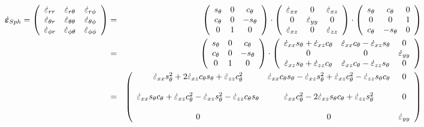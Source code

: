 \documentclass[a4paper,12pt]{article}
\begin{document}
\begin{eqnarray}
\dot{\bm \varepsilon}_{\tiny Sph}=
\left(
\begin{array}{ccc}
\dot\varepsilon_{rr}       & \dot\varepsilon_{r\theta}      & \dot\varepsilon_{r\phi} \\
\dot\varepsilon_{\theta r} & \dot\varepsilon_{\theta\theta} & \dot\varepsilon_{\theta\phi} \\
\dot\varepsilon_{\phi r}   & \dot\varepsilon_{\phi \theta}  & \dot\varepsilon_{\phi\phi}
\end{array}
\right)
&=&
\left(
\begin{array}{ccc}
s_\theta  & 0 & c_\theta \\
c_\theta  & 0 & -s_\theta \\
0 & 1 & 0 
\end{array}
\right)
\cdot
\left(
\begin{array}{ccc}
\dot\varepsilon_{xx} & 0 & \dot{\varepsilon}_{xz} \\
0 & \dot{\varepsilon}_{yy}  & 0 \\
\dot{\varepsilon}_{xz} & 0 & \dot\varepsilon_{zz}
\end{array}
\right)
\cdot
\left(
\begin{array}{ccc}
s_\theta & c_\theta & 0 \\
0 & 0 & 1 \\
c_\theta & -s_\theta & 0
\end{array}
\right)  \nonumber\\
&=&
\left(
\begin{array}{ccc}
s_\theta  & 0 & c_\theta \\
c_\theta  & 0 & -s_\theta \\
0 & 1 & 0 
\end{array}
\right)
\cdot
\left(
\begin{array}{ccc}
\dot\varepsilon_{xx} s_\theta + 
\dot\varepsilon_{xz} c_\theta  & 
\dot\varepsilon_{xx} c_\theta - 
\dot\varepsilon_{xz} s_\theta  &
0 \\
0 & 0 & \dot{\varepsilon}_{yy}  
\\
\dot\varepsilon_{xz} s_\theta + 
\dot\varepsilon_{zz} c_\theta  &
\dot\varepsilon_{xz} c_\theta - 
\dot\varepsilon_{zz} s_\theta  &
0 
\end{array}
\right)  \nonumber\\
&=&
\left(
\begin{array}{ccc}
\dot\varepsilon_{xx} s_\theta^2 + 
2 \dot\varepsilon_{xz} c_\theta  s_\theta +
\dot\varepsilon_{zz} c_\theta ^2  
& 
\dot\varepsilon_{xx} c_\theta s_\theta - 
\dot\varepsilon_{xz} s_\theta^2  +
\dot\varepsilon_{xz} c_\theta^2 - 
\dot\varepsilon_{zz} s_\theta c_\theta 
& 0 \\ \\
\dot\varepsilon_{xx} s_\theta c_\theta+ 
\dot\varepsilon_{xz} c_\theta^2  -
\dot\varepsilon_{xz} s_\theta^2 -
\dot\varepsilon_{zz} c_\theta s_\theta 
&
\dot\varepsilon_{xx} c_\theta^2 - 
2\dot\varepsilon_{xz} s_\theta c_\theta +
\dot\varepsilon_{zz} s_\theta^2  
& 0 
\\ \\
0 & 0 & \dot{\varepsilon}_{yy} 
\end{array}
\right)  \nonumber
\end{eqnarray}
\end{document}
